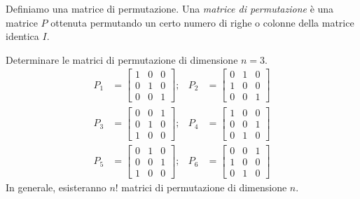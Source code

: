 \documentclass[12pt]{report}
\begin{document}
Definiamo una matrice di permutazione. Una \textit{matrice di permutazione} è una matrice $P$ ottenuta permutando un certo numero di righe o colonne della matrice identica $I$.
\begin{example}{}{}
Determinare le matrici di permutazione di dimensione $n = 3$.
\begin{align*}
P_1 &= \begin{bmatrix} 1 & 0 & 0 \\ 0 & 1 & 0 \\ 0 & 0 & 1 \end{bmatrix}; &
P_2 &= \begin{bmatrix} 0 & 1 & 0 \\ 1 & 0 & 0 \\ 0 & 0 & 1 \end{bmatrix} \\[10pt]
P_3 &= \begin{bmatrix} 0 & 0 & 1 \\ 0 & 1 & 0 \\ 1 & 0 & 0 \end{bmatrix}; &
P_4 &= \begin{bmatrix} 1 & 0 & 0 \\ 0 & 0 & 1 \\ 0 & 1 & 0 \end{bmatrix} \\[10pt]
P_5 &= \begin{bmatrix} 0 & 1 & 0 \\ 0 & 0 & 1 \\ 1 & 0 & 0 \end{bmatrix}; &
P_6 &= \begin{bmatrix} 0 & 0 & 1 \\ 1 & 0 & 0 \\ 0 & 1 & 0 \end{bmatrix}
\end{align*}
In generale, esisteranno $n!$ matrici di permutazione di dimensione $n$.
\end{example}
\end{document}
